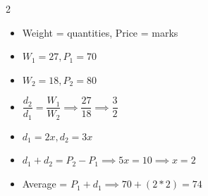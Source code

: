 \begin{multicols}{2}

    \begin{itemize}
        \item Weight = quantities, Price = marks 
        \item $W_1 = 27, P_1 = 70$
        \item $W_2 = 18, P_2 = 80$
    \end{itemize}
    
    \columnbreak

    \begin{itemize}
        \item $\dfrac{d_2}{d_1} = \dfrac{W_1}{W_2} \implies \dfrac{27}{18} \implies \dfrac{3}{2}$
        \item $d_1 = 2x, d_2 = 3x$
        \item $d_1 + d_2 = P_2 - P_1 \implies 5x = 10 \implies x = 2$
        \item Average = $P_1 + d_1 \implies 70 + (2 * 2) = 74$
    \end{itemize}

\end{multicols}

